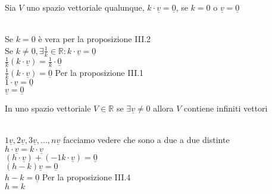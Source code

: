 \begin{proposizione}
	Sia $V$ uno spazio vettoriale qualunque, $k\cdot \underline{v}=\underline{0}$, se $k=0$ o $\underline{v}=\underline{0}$\\
	\begin{dimostrazione}
		\phantom{}\\
		Se $k=0$ è vera per la proposizione III.2\\
		Se $k\neq0, \exists \frac{1}{k}\in\mathbb{R}: k\cdot \underline{v}=\underline{0}$\\
		$\frac{1}{k}(k\cdot \underline{v})=\frac{1}{k}\cdot \underline{0}$\\
		$\frac{1}{k}(k\cdot \underline{v})=\underline{0}$ Per la proposizione III.1\\
		$1\cdot \underline{v}=\underline{0}$\\
		$\underline{v}=\underline{0}$
	\end{dimostrazione}
\end{proposizione}

\begin{proposizione}
	In uno spazio vettoriale $V\in\mathbb{R}$ se $\exists \underline{v}\neq 0$ allora $V$ contiene infiniti vettori\\
	\begin{dimostrazione}
		\phantom{}\\
		$1\underline{v}, 2\underline{v}, 3\underline{v},..., n\underline{v}$ facciamo vedere che sono a due a due distinte\\
		$h\cdot \underline{v}=k\cdot \underline{v}$\\
		$(h\cdot \underline{v})+(-1k\cdot \underline{v})=\underline{0}$\\
		$(h-k)\underline{v}=\underline{0}$\\
		$h-k=\underline{0}$ Per la proposizione III.4\\
		$h=k$
	\end{dimostrazione}
\end{proposizione}

